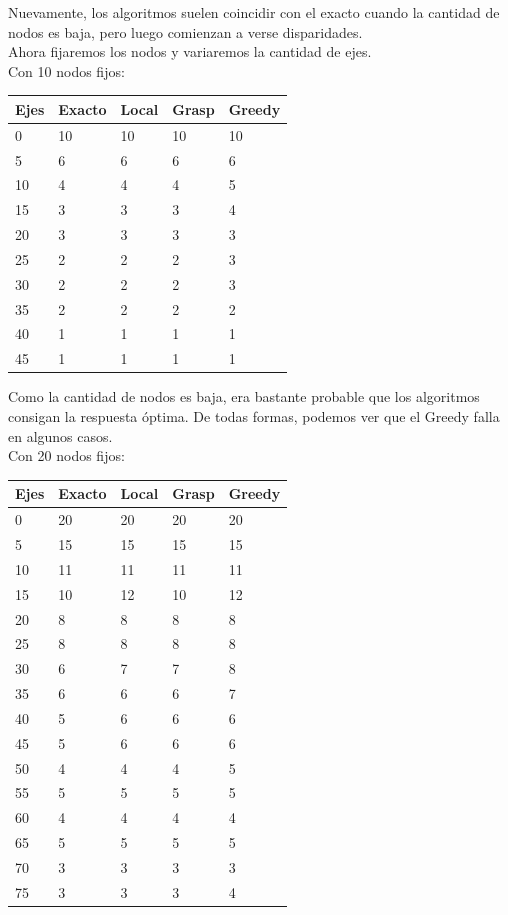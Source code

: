 Nuevamente, los algoritmos suelen coincidir con el exacto cuando la cantidad de nodos es baja, pero luego comienzan a verse disparidades.\\

Ahora fijaremos los nodos y variaremos la cantidad de ejes.\\

Con 10 nodos fijos:\\
\begin{tabular}{| l | l | l | l | l |}
 \hline
Ejes&Exacto&Local&Grasp&Greedy \\ \hline
0&10&10&10&10 \\ \hline
5&6&6&6&6 \\ \hline
10&4&4&4&5 \\ \hline
15&3&3&3&4 \\ \hline
20&3&3&3&3 \\ \hline
25&2&2&2&3 \\ \hline
30&2&2&2&3 \\ \hline
35&2&2&2&2 \\ \hline
40&1&1&1&1 \\ \hline
45&1&1&1&1 \\ \hline
\end{tabular}

Como la cantidad de nodos es baja, era bastante probable que los algoritmos consigan la respuesta \'optima. De todas formas, podemos ver que el Greedy falla en algunos casos.\\

Con 20 nodos fijos:\\
\begin{tabular}{| l | l | l | l | l |}
 \hline
Ejes&Exacto&Local&Grasp&Greedy \\ \hline
0&20&20&20&20 \\ \hline
5&15&15&15&15 \\ \hline
10&11&11&11&11 \\ \hline
15&10&12&10&12 \\ \hline
20&8&8&8&8 \\ \hline
25&8&8&8&8 \\ \hline
30&6&7&7&8 \\ \hline
35&6&6&6&7 \\ \hline
40&5&6&6&6 \\ \hline
45&5&6&6&6 \\ \hline
50&4&4&4&5 \\ \hline
55&5&5&5&5 \\ \hline
60&4&4&4&4 \\ \hline
65&5&5&5&5 \\ \hline
70&3&3&3&3 \\ \hline
75&3&3&3&4 \\ \hline
\end{tabular}

